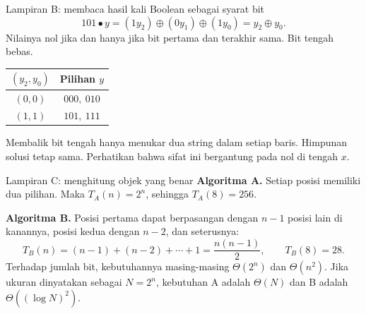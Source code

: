 \documentclass[aspectratio=169,11pt]{beamer}
\begin{document}
\begin{frame}{Lampiran B: membaca hasil kali Boolean sebagai syarat bit}
\[
101\bullet y=(1y_2)\oplus(0y_1)\oplus(1y_0)=y_2\oplus y_0.
\]
Nilainya nol jika dan hanya jika bit pertama dan terakhir sama. Bit tengah bebas.
\begin{center}\begin{tabular}{c|c}
$(y_2,y_0)$& Pilihan $y$\\\hline
$(0,0)$ & $000,\ 010$\\
$(1,1)$ & $101,\ 111$
\end{tabular}\end{center}
Membalik bit tengah hanya menukar dua string dalam setiap baris. Himpunan solusi tetap sama. Perhatikan bahwa sifat ini bergantung pada nol di tengah $x$.
\end{frame}

\begin{frame}{Lampiran C: menghitung objek yang benar}
\textbf{Algoritma A.} Setiap posisi memiliki dua pilihan. Maka $T_A(n)=2^n$, sehingga $T_A(8)=256$.
\par\medskip
\textbf{Algoritma B.} Posisi pertama dapat berpasangan dengan $n-1$ posisi lain di kanannya, posisi kedua dengan $n-2$, dan seterusnya:
\[
T_B(n)=(n-1)+(n-2)+\cdots+1=\frac{n(n-1)}2,\qquad T_B(8)=28.
\]
Terhadap jumlah bit, kebutuhannya masing-masing $\Theta(2^n)$ dan $\Theta(n^2)$. Jika ukuran dinyatakan sebagai $N=2^n$, kebutuhan A adalah $\Theta(N)$ dan B adalah $\Theta((\log N)^2)$.
\end{frame}
\end{document}
